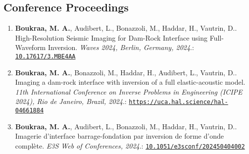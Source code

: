 \documentclass[10pt]{article}
\begin{document}
\subsection{Conference Proceedings}
\begin{enumerate}
\item \textbf{Boukraa, M. A.}, Audibert, L., Bonazzoli, M., Haddar, H., Vautrin, D.. High-Resolution Seismic Imaging for Dam-Rock Interface using Full-Waveform Inversion. \textit{Waves 2024, Berlin, Germany, 2024}.: \href{https://doi.org/10.17617/3.MBE4AA}{\nolinkurl{10.17617/3.MBE4AA}}
\item \textbf{Boukraa, M. A.}, Bonazzoli, M., Haddar, H., Audibert, L., Vautrin, D.. Imaging a dam-rock interface with inversion of a full elastic-acoustic model. \textit{11th International Conference on Inverse Problems in Engineering (ICIPE 2024), Rio de Janeiro, Brazil, 2024}.: \href{https://uca.hal.science/hal-04661884}{\nolinkurl{https://uca.hal.science/hal-04661884}}
\item \textbf{Boukraa, M. A.}, Audibert, L., Bonazzoli, M., Haddar, H., Vautrin, D.. Imagerie d’interface barrage-fondation par inversion de forme d’onde complète. \textit{E3S Web of Conferences, 2024}.: \href{https://doi.org/10.1051/e3sconf/202450404002}{\nolinkurl{10.1051/e3sconf/202450404002}}
\end{enumerate}
\end{document}
